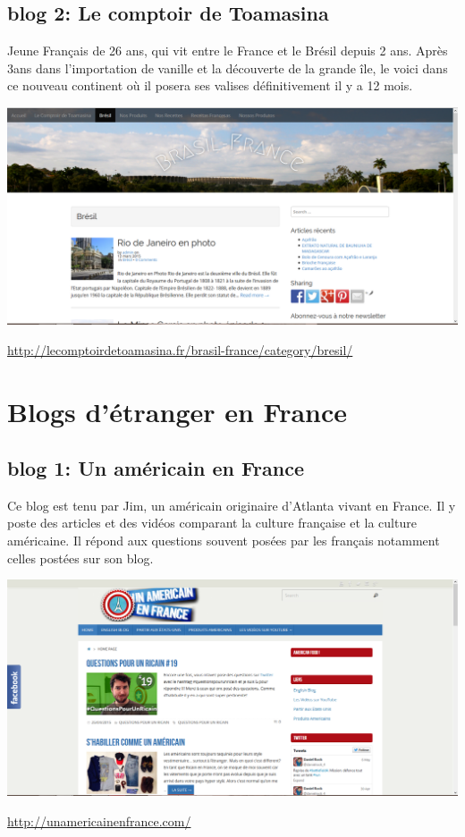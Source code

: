 \section{blog 2: Le comptoir de Toamasina}
Jeune Français de 26 ans, qui vit entre le France et le Brésil depuis 2 ans. Après 3ans dans l'importation de vanille et la découverte de la grande île, le voici dans ce nouveau continent où il posera ses valises définitivement il y a 12 mois.
\begin{center}
\includegraphics[scale=0.25]{Toamasina.png}
\end{center}
\url{http://lecomptoirdetoamasina.fr/brasil-france/category/bresil/}

\chapter{Blogs d'étranger en France}
\section{blog 1: Un américain en France}
Ce blog est tenu par Jim, un américain originaire d'Atlanta vivant en France. Il y poste des articles et des vidéos comparant la culture française et la culture américaine. Il répond aux questions souvent posées par les français notamment celles postées sur son blog.
\begin{center}
\includegraphics[scale=0.25]{Americain.png}
\end{center}
\url{http://unamericainenfrance.com/}

